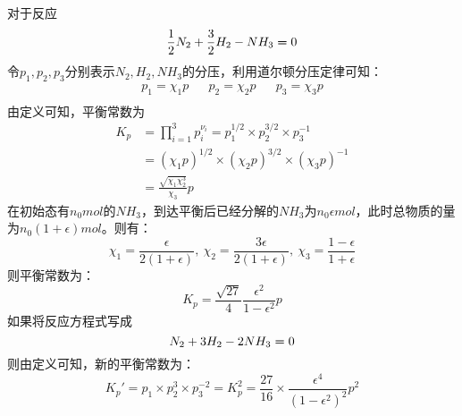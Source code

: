 \documentclass[a4paper,12pt]{article}
\begin{document}
\section{}
对于反应
\begin{equation}\nonumber
	\frac{1}{2}N_2 + \frac{3}{2}H_2 - NH_3 \xlongequal[]{}  0
\end{equation}
令$p_1,p_2,p_3$分别表示$N_2,H_2,NH_3$的分压，利用道尔顿分压定律可知：
\begin{equation}\nonumber
\begin{aligned}
	p_1 = \chi_1p & & p_2 = \chi_2p & & p_3 = \chi_3 p \\
\end{aligned}
\end{equation}
由定义可知，平衡常数为
\begin{equation}\nonumber
\begin{aligned}
	K_p &= \prod_{i=1}^3 p_i^{\nu_i} = p_1^{1/2}\times p_2^{3/2}\times p_3^{-1} \\
	&= \left( \chi_1p \right)^{1/2} \times \left( \chi_2 p \right)^{3/2} \times \left( \chi_3 p \right)^{-1} \\
	&= \frac{\sqrt{\chi_1\chi_2^3}}{\chi_3} p
\end{aligned}
\end{equation}
在初始态有$n_0 mol$的$NH_3$，到达平衡后已经分解的$NH_3$为$n_0 \epsilon mol$，此时总物质的量为$n_0(1+\epsilon) mol$。则有：
\begin{equation}\nonumber
	\chi_1 = \frac{\epsilon}{2(1+\epsilon)},~\chi_2 = \frac{3\epsilon}{2(1+\epsilon)},~\chi_3 = \frac{1-\epsilon}{1+\epsilon}
\end{equation}
则平衡常数为：
\begin{equation}\nonumber
	K_p = \frac{\sqrt{27}}{4} \frac{\epsilon^2}{1-\epsilon^2}p
\end{equation}
如果将反应方程式写成
\begin{equation}\nonumber
	N_2 + 3H_2 - 2NH_3 \xlongequal[]{}  0
\end{equation}
则由定义可知，新的平衡常数为：
\begin{equation}\nonumber
	K_p' = p_1\times p_2^3 \times p_3^{-2} = K_p^2 = \frac{27}{16}\times \frac{\epsilon ^4}{\left(1-\epsilon^2\right)^2} p^2
\end{equation}
\end{document}
